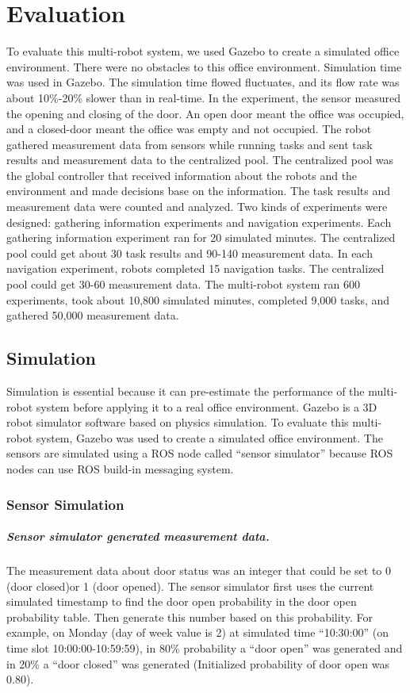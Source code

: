 \chapter{Evaluation}
\label{ch:evaluation}
To evaluate this multi-robot system, we used Gazebo to create a simulated office environment. There were no obstacles to this office environment. Simulation time was used in Gazebo. The simulation time flowed fluctuates, and its flow rate was about 10\%-20\% slower than in real-time. In the experiment, the sensor measured the opening and closing of the door. An open door meant the office was occupied, and a closed-door meant the office was empty and not occupied. The robot gathered measurement data from sensors while running tasks and sent task results and measurement data to the centralized pool. The centralized pool was the global controller that received information about the robots and the environment and made decisions base on the information. The task results and measurement data were counted and analyzed. Two kinds of experiments were designed: gathering information experiments and navigation experiments. Each gathering information experiment ran for 20 simulated minutes. The centralized pool could get about 30 task results and 90-140 measurement data. In each navigation experiment, robots completed 15 navigation tasks. The centralized pool could get 30-60 measurement data. The multi-robot system ran 600 experiments, took about 10,800 simulated minutes, completed 9,000 tasks, and gathered 50,000 measurement data. 

\section{Simulation}

Simulation is essential because it can pre-estimate the performance of the multi-robot system before applying it to a real office environment.
Gazebo is a 3D robot simulator software based on physics simulation. 
To evaluate this multi-robot system, Gazebo was used to create a simulated office environment. The sensors are simulated using a ROS node called ``sensor simulator'' because ROS nodes can use ROS build-in messaging system.

\subsection{Sensor Simulation}
\label{sec:sensor_simulation}

\paragraph{Sensor simulator generated measurement data.}
The measurement data about door status was an integer that could be set to 0 (door closed)or 1 (door opened). The sensor simulator first uses the current simulated timestamp to find the door open probability in the door open probability table. Then generate this number based on this probability. For example, on Monday (day of week value is 2) at simulated time ``10:30:00'' (on time slot 10:00:00-10:59:59), in 80\% probability a ``door open'' was generated and in 20\% a ``door closed'' was generated (Initialized probability of door open was 0.80).


